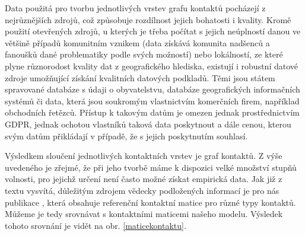 Data použitá pro tvorbu jednotlivých vrstev grafu kontaktů pocházejí z nejrůznějších zdrojů, což způsobuje rozdílnost jejich bohatosti i kvality. Kromě použití otevřených zdrojů, u kterých je třeba počítat s jejich neúplností danou ve většině případů komunitním vznikem (data získává komunita nadšenců a fanoušků dané problematiky podle svých možností) nebo lokálností, ze které plyne různorodost kvality dat z geografického hlediska, existují i robustní datové zdroje umožňující získání kvalitních datových podkladů. Těmi jsou státem spravované databáze s údaji o obyvatelstvu, databáze geografických informačních systémů či data, která jsou soukromým vlastnictvím komerčních firem, například obchodních řetězců. Přístup k takovým datům je omezen jednak prostřednictvím GDPR, jednak ochotou vlastníků taková data poskytnout a dále cenou, kterou svým datům přikládají v případě, že s jejich poskytnutím souhlasí. 

Výsledkem sloučení jednotlivých kontaktních vrstev je graf kontaktů. Z výše uvedeného je zřejmé, že při jeho tvorbě máme k dispozici velké množství stupňů volnosti, pro jejichž určení není často možné získat empirická data. Jak již z textu vysvítá, důležitým zdrojem vědecky podložených informací je pro nás publikace \cite{Prem_etal2017}, která obsahuje referenční kontaktní matice pro různé typy kontaktů. Můžeme je tedy srovnávat s kontaktními maticemi našeho modelu. Výsledek tohoto srovnání je vidět na obr. \ref{maticekontaktu}.

